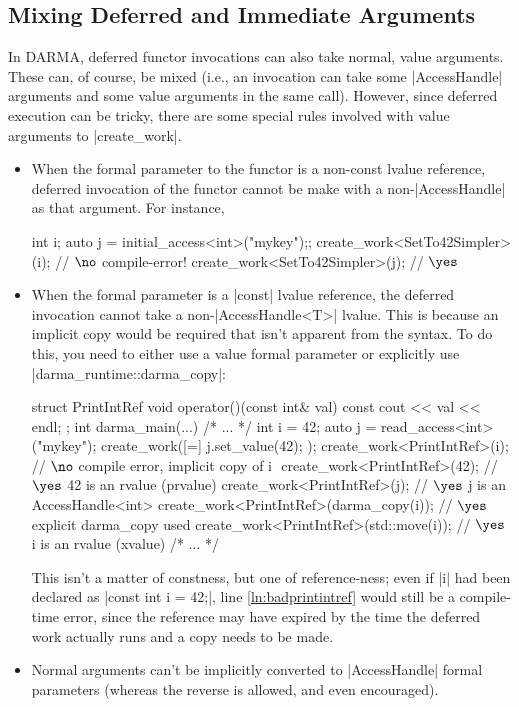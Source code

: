 \subsection{Mixing Deferred and Immediate Arguments}

In DARMA, deferred functor invocations can also take normal, value arguments. 
These can, of course, be mixed (i.e., an invocation can take some
|AccessHandle| arguments and some value arguments in the same call).  However,
since deferred execution can be tricky, there are some special rules involved with value arguments to |create_work|.
\begin{itemize}
  \item When the formal parameter to the functor is a non-const lvalue
  reference, deferred invocation of the functor cannot be make with a
  non-|AccessHandle| as that argument.  For instance,
\begin{CppCodeNumb}
int i;
auto j = initial_access<int>("mykey");;
create_work<SetTo42Simpler>(i); // $\no$ compile-error!
create_work<SetTo42Simpler>(j); // $\yes$
\end{CppCodeNumb}
  \item When the formal parameter is a |const| lvalue reference, the deferred
  invocation cannot take a non-|AccessHandle<T>| lvalue.  This is because an
  implicit copy would be required that isn't apparent from the syntax.  To do
  this, you need to either use a value formal parameter or explicitly use
  |darma_runtime::darma_copy|:
\begin{CppCodeNumb}
struct PrintIntRef {
  void operator()(const int& val) const { cout << val << endl; }
};
int darma_main(...) {
  /* ... */
  int i = 42;
  auto j = read_access<int>("mykey");
  create_work([=]{ j.set_value(42); });
  create_work<PrintIntRef>(i); // $\no$ compile error, implicit copy of i $\label{ln:badprintintref}$
  create_work<PrintIntRef>(42); // $\yes$ 42 is an rvalue (prvalue)
  create_work<PrintIntRef>(j); // $\yes$ j is an AccessHandle<int>
  create_work<PrintIntRef>(darma_copy(i)); // $\yes$ explicit darma_copy used
  create_work<PrintIntRef>(std::move(i)); // $\yes$ i is an rvalue (xvalue)
  /* ... */
}
\end{CppCodeNumb}
  This isn't a matter of constness, but one of reference-ness; even if |i| had
  been declared as |const int i = 42;|, line \ref{ln:badprintintref} would still
  be a compile-time error, since the reference may have expired by the time the
  deferred work actually runs and a copy needs to be made.
  \item Normal arguments can't be implicitly converted to |AccessHandle| formal
  parameters (whereas the reverse is allowed, and even encouraged).
\end{itemize}


